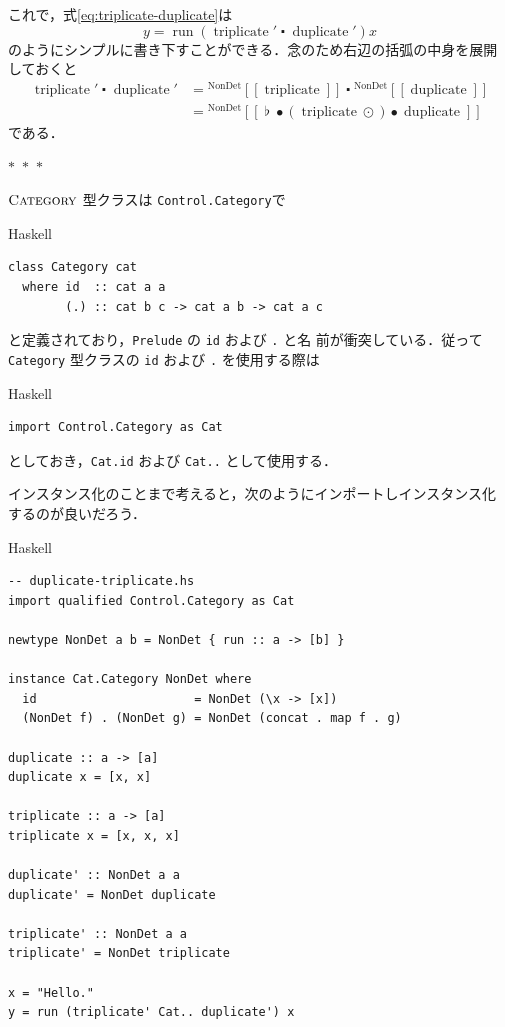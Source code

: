 \documentclass[a5paper,twoside,fleqn,draft]{jsbook}
\def\[{\left[\!\left[}
\def\]{\right]\!\right]}
\newcommand{\separator}{\begin{center}$*$~$*$~$*$\end{center}}
\newcommand{\programminglanguage}[1]{\textsf{#1}}
\newcommand{\haskell}{\programminglanguage{Haskell}}
\newcommand{\code}[1]{\texttt{#1}}
\newcommand{\filename}[1]{\texttt{#1}}
\newenvironment{haskellcode}{\begin{itembox}[r]{\haskell}}{\end{itembox}}
\newcommand{\mSpecialFunc}[1]{\mathrm{#1}}
\DeclareMathOperator{\mDuplicate}{\mSpecialFunc{duplicate}}
\DeclareMathOperator{\mRun}{\mSpecialFunc{run}}
\DeclareMathOperator{\mTriplicate}{\mSpecialFunc{triplicate}}
\DeclareMathOperator{\mComp}{\bullet} %
\DeclareMathOperator{\mCompCat}{\centerdot}
\DeclareMathOperator{\mConcat}{\flat}
\DeclareMathOperator{\mMapList}{\odot}
\newcommand{\mValueConstructor}[1]{\mathrm{#1}}
\newcommand{\mGenericValueAssemble}[2]{{}^\mValueConstructor{#1}\[#2\]}
\newcommand{\mGenericTypeClass}[1]{\textsc{#1}} %
\newcommand{\mCategoryTypeClass}{\mGenericTypeClass{Category}}
\begin{document}
これで，式\eqref{eq:triplicate-duplicate}は
\begin{equation}
  y=\mRun(\mTriplicate'\mCompCat\mDuplicate')x
\end{equation}
のようにシンプルに書き下すことができる．念のため右辺の括弧の中身を展開
しておくと
\begin{align}
  \mTriplicate'\mCompCat\mDuplicate'
  &=\mGenericValueAssemble{NonDet}{\mTriplicate}\mCompCat\mGenericValueAssemble{NonDet}{\mDuplicate}\\
  &=\mGenericValueAssemble{NonDet}{\mConcat\mComp(\mTriplicate\mMapList)\mComp\mDuplicate}
\end{align}
である．

\separator

$\mCategoryTypeClass$ 型クラスは \filename{Control.Category}で
\begin{haskellcode}
\begin{verbatim}
class Category cat
  where id  :: cat a a
        (.) :: cat b c -> cat a b -> cat a c
\end{verbatim}
\end{haskellcode}
と定義されており，\filename{Prelude} の \code{id} および \code{.} と名
前が衝突している．従って \code{Category} 型クラスの \code{id} および
\code{.} を使用する際は
\begin{haskellcode}
\begin{verbatim}
import Control.Category as Cat
\end{verbatim}
\end{haskellcode}
としておき，\code{Cat.id} および \code{Cat..} として使用する．

インスタンス化のことまで考えると，次のようにインポートしインスタンス化
するのが良いだろう．
\begin{haskellcode}
\begin{verbatim}
-- duplicate-triplicate.hs
import qualified Control.Category as Cat

newtype NonDet a b = NonDet { run :: a -> [b] }

instance Cat.Category NonDet where
  id                      = NonDet (\x -> [x])
  (NonDet f) . (NonDet g) = NonDet (concat . map f . g)

duplicate :: a -> [a]
duplicate x = [x, x]

triplicate :: a -> [a]
triplicate x = [x, x, x]

duplicate' :: NonDet a a
duplicate' = NonDet duplicate

triplicate' :: NonDet a a
triplicate' = NonDet triplicate

x = "Hello."
y = run (triplicate' Cat.. duplicate') x
\end{verbatim}
\end{haskellcode}
\end{document}
